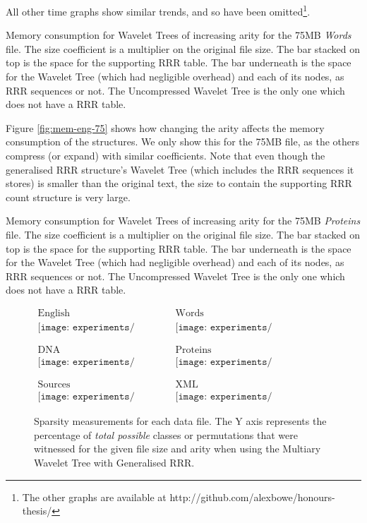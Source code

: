 All other time graphs show similar trends, and so have been omitted\footnote{The 
other graphs are available at http://github.com/alexbowe/honours-thesis/}.

			{Memory consumption for Wavelet Trees of increasing arity for
			the 75MB \emph{Words} file. The size coefficient is a multiplier
			on the original file size. The bar stacked on top is the space for
			the supporting RRR table. The bar underneath is the space for
			the Wavelet Tree (which had negligible overhead) and each of its
			nodes, as RRR sequences or not. The Uncompressed Wavelet Tree is
			the only one which does not have a RRR table.}

Figure \ref{fig:mem-eng-75} shows how changing the arity affects the memory
consumption of the structures. We only show this for the 75MB file, as the 
others compress (or expand) with similar coefficients. Note that even though 
the generalised RRR structure's Wavelet Tree (which includes the RRR sequences 
it stores) is smaller than the original text, the size to contain the supporting 
RRR count structure is very large.

			{Memory consumption for Wavelet Trees of increasing arity for
			the 75MB \emph{Proteins} file. The size coefficient is a multiplier
			on the original file size. The bar stacked on top is the space for
			the supporting RRR table. The bar underneath is the space for
			the Wavelet Tree (which had negligible overhead) and each of its
			nodes, as RRR sequences or not. The Uncompressed Wavelet Tree is
			the only one which does not have a RRR table.}
		
	
\begin{figure}[h]
\begin{center}$
\begin{array}{cc}
\mbox{English} & \mbox{Words} \\
\texttt{[image: experiments/sparse\_english]} &
\texttt{[image: experiments/sparse\_english\_ints]} \\ \\ \\
\mbox{DNA} & \mbox{Proteins} \\ 
\texttt{[image: experiments/sparse\_dna]} &
\texttt{[image: experiments/sparse\_proteins]} \\ \\ \\
\mbox{Sources} & \mbox{XML} \\
\texttt{[image: experiments/sparse\_sources]} &
\texttt{[image: experiments/sparse\_dblp\_xml]}
\end{array}$
\end{center}
\caption{Sparsity measurements for each data file. The Y axis represents
the percentage of \emph{total possible} classes or permutations that were
witnessed for the given file size and arity when using the 
Multiary Wavelet Tree with Generalised RRR.}
\label{fig:sparse}
\end{figure}

